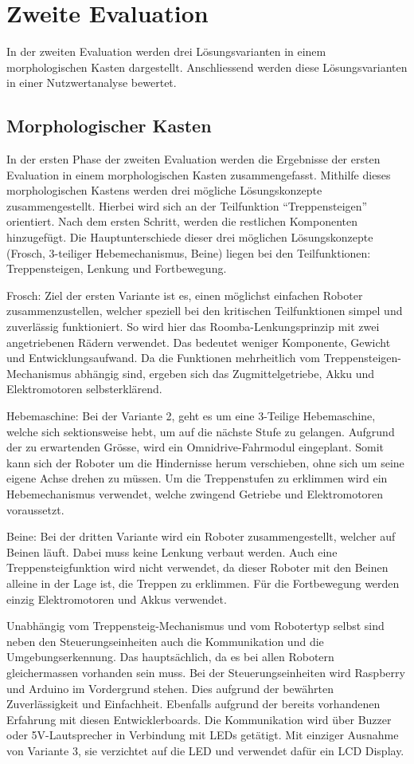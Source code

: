 \section{Zweite Evaluation}
In der zweiten Evaluation werden drei Lösungsvarianten in einem morphologischen Kasten dargestellt. Anschliessend werden diese Lösungsvarianten in einer Nutzwertanalyse bewertet.
\subsection{Morphologischer Kasten}
In der ersten Phase der zweiten Evaluation werden die Ergebnisse der ersten Evaluation in einem morphologischen Kasten zusammengefasst. Mithilfe dieses morphologischen Kastens werden drei mögliche Lösungskonzepte zusammengestellt. Hierbei wird sich an der Teilfunktion ``Treppensteigen'' orientiert. Nach dem ersten Schritt, werden die restlichen Komponenten hinzugefügt. Die Hauptunterschiede dieser drei möglichen Lösungskonzepte (Frosch, 3-teiliger Hebemechanismus, Beine) liegen bei den Teilfunktionen: Treppensteigen, Lenkung und Fortbewegung.

Frosch: Ziel der ersten Variante ist es, einen möglichst einfachen Roboter zusammenzustellen, welcher speziell bei den kritischen Teilfunktionen simpel und zuverlässig funktioniert. So wird hier das Roomba-Lenkungsprinzip mit zwei angetriebenen Rädern verwendet. Das bedeutet weniger Komponente, Gewicht und Entwicklungsaufwand. Da die Funktionen mehrheitlich vom Treppensteigen-Mechanismus abhängig sind, ergeben sich das Zugmittelgetriebe, Akku und Elektromotoren selbsterklärend.

Hebemaschine: Bei der Variante 2, geht es um eine 3-Teilige Hebemaschine, welche sich sektionsweise hebt, um auf die nächste Stufe zu gelangen. Aufgrund der zu erwartenden Grösse, wird ein Omnidrive-Fahrmodul eingeplant. Somit kann sich der Roboter um die Hindernisse herum verschieben, ohne sich um seine eigene Achse drehen zu müssen. Um die Treppenstufen zu erklimmen wird ein Hebemechanismus verwendet, welche zwingend Getriebe und Elektromotoren voraussetzt.

Beine: Bei der dritten Variante wird ein Roboter zusammengestellt, welcher auf Beinen läuft. Dabei muss keine Lenkung verbaut werden. Auch eine Treppensteigfunktion wird nicht verwendet, da dieser Roboter mit den Beinen alleine in der Lage ist, die Treppen zu erklimmen. Für die Fortbewegung werden einzig Elektromotoren und Akkus verwendet.

Unabhängig vom Treppensteig-Mechanismus und vom Robotertyp selbst sind neben den Steuerungseinheiten auch die Kommunikation und die Umgebungserkennung. Das hauptsächlich, da es bei allen Robotern gleichermassen vorhanden sein muss. Bei der Steuerungseinheiten wird Raspberry und Arduino im Vordergrund stehen. Dies aufgrund der bewährten Zuverlässigkeit und Einfachheit. Ebenfalls aufgrund der bereits vorhandenen Erfahrung mit diesen Entwicklerboards. Die Kommunikation wird über Buzzer oder 5V-Lautsprecher in Verbindung mit LEDs getätigt. Mit einziger Ausnahme von Variante 3, sie verzichtet auf die LED und verwendet dafür ein LCD Display.


